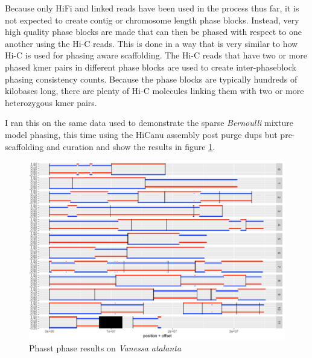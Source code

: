 \par{
Because only HiFi and linked reads have been used in the process thus far, it is not expected to create contig or chromosome length phase blocks. Instead, very high quality phase blocks are made that  can then be phased with respect to one another using the Hi-C reads. This is done in a way that is very similar to how Hi-C is used for phasing aware scaffolding. The Hi-C reads that have two or more phased kmer pairs in different phase blocks are used to create inter-phaseblock phasing consistency counts. Because the phase blocks are typically hundreds of kilobases long, there are plenty of Hi-C molecules linking them with two or more heterozygous kmer pairs.
} 

\par{
I ran this on the same data used to demonstrate the sparse \textit{Bernoulli} mixture model phasing, this time using the HiCanu assembly post purge dups but pre-scaffolding and curation and show the results in figure \ref{figure:phasstphase}.
}


\begin{figure}[htbp!]
\caption{Phasst phase results on \textit{Vanessa atalanta}}
\label{figure:phasstphase}
\begin{centering}
\includegraphics[width=\textwidth]{phasstphase.png}
\end{centering}

\end{figure}

